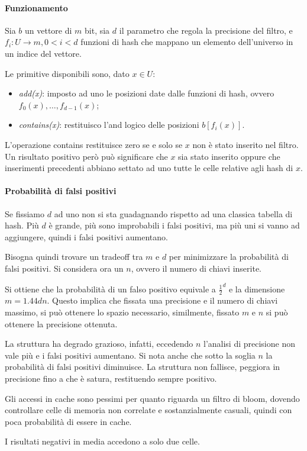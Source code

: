 \paragraph{Funzionamento}

Sia $b$ un vettore di $m$ bit, sia $d$ il parametro che regola la precisione del filtro,
e $f_i : U \rightarrow m, 0 < i < d$ funzioni di hash che mappano un elemento dell'universo 
in un indice del vettore. 

Le primitive disponibili sono, dato $x \in U$: 
\begin{itemize}
    \item \emph{add(x)}: imposto ad uno le posizioni date dalle funzioni di hash, 
    ovvero $f_0(x), \dots, f_{d-1}(x)$;
    \item \emph{contains(x)}: restituisco l'and logico delle posizioni $b[f_i(x)]$.
\end{itemize}

L'operazione contains restituisce zero se e solo se $x$ non è stato inserito nel filtro. 
Un risultato positivo però può significare che $x$ sia stato inserito oppure che 
inserimenti precedenti abbiano settato ad uno tutte le celle relative agli hash di $x$.

\paragraph{Probabilità di falsi positivi}
Se fissiamo $d$ ad uno non si sta guadagnando rispetto ad una classica tabella di hash.
Più $d$ è grande, più sono improbabili i falsi positivi, ma più uni si vanno ad aggiungere, quindi i falsi positivi aumentano.

Bisogna quindi trovare un tradeoff tra $m$ e $d$ per minimizzare la probabilità di falsi positivi.
Si considera ora un $n$, ovvero il numero di chiavi inserite. 

Si ottiene che la probabilità di un falso positivo equivale a $\frac{1}{2}^d$ e la 
dimensione $m = 1.44 dn$. 
Questo implica che fissata una precisione e il numero di chiavi massimo, si può ottenere lo 
spazio necessario, similmente, fissato $m$ e $n$ si può ottenere la precisione ottenuta.

\begin{remark}
    La struttura ha degrado grazioso, infatti, eccedendo $n$ l'analisi di precisione non vale più e 
    i falsi positivi aumentano. Si nota anche che sotto la soglia $n$ la probabilità di falsi 
    positivi diminuisce. 
    La struttura non fallisce, peggiora in precisione fino a che è satura, restituendo sempre positivo.
\end{remark}
\begin{remark}
    Gli accessi in cache sono pessimi per quanto riguarda un filtro di bloom, 
    dovendo controllare celle di memoria non correlate e sostanzialmente casuali, 
    quindi con poca probabilità di essere in cache.
\end{remark}
\begin{remark}
    I risultati negativi in media accedono a solo due celle.
\end{remark}

